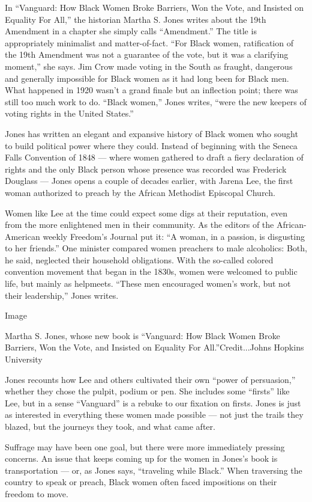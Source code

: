 In ``Vanguard: How Black Women Broke Barriers, Won the Vote, and
Insisted on Equality For All,'' the historian Martha S. Jones writes
about the 19th Amendment in a chapter she simply calls ``Amendment.''
The title is appropriately minimalist and matter-of-fact. ``For Black
women, ratification of the 19th Amendment was not a guarantee of the
vote, but it was a clarifying moment,'' she says. Jim Crow made voting
in the South as fraught, dangerous and generally impossible for Black
women as it had long been for Black men. What happened in 1920 wasn't a
grand finale but an inflection point; there was still too much work to
do. ``Black women,'' Jones writes, ``were the new keepers of voting
rights in the United States.''

Jones has written an elegant and expansive history of Black women who
sought to build political power where they could. Instead of beginning
with the Seneca Falls Convention of 1848 --- where women gathered to
draft a fiery declaration of rights and the only Black person whose
presence was recorded was Frederick Douglass --- Jones opens a couple of
decades earlier, with Jarena Lee, the first woman authorized to preach
by the African Methodist Episcopal Church.

Women like Lee at the time could expect some digs at their reputation,
even from the more enlightened men in their community. As the editors of
the African-American weekly Freedom's Journal put it: ``A woman, in a
passion, is disgusting to her friends.'' One minister compared women
preachers to male alcoholics: Both, he said, neglected their household
obligations. With the so-called colored convention movement that began
in the 1830s, women were welcomed to public life, but mainly as
helpmeets. ``These men encouraged women's work, but not their
leadership,'' Jones writes.

Image

Martha S. Jones, whose new book is ``Vanguard: How Black Women Broke
Barriers, Won the Vote, and Insisted on Equality For
All.''Credit...Johns Hopkins University

Jones recounts how Lee and others cultivated their own ``power of
persuasion,'' whether they chose the pulpit, podium or pen. She includes
some ``firsts'' like Lee, but in a sense ``Vanguard'' is a rebuke to our
fixation on firsts. Jones is just as interested in everything these
women made possible --- not just the trails they blazed, but the
journeys they took, and what came after.

Suffrage may have been one goal, but there were more immediately
pressing concerns. An issue that keeps coming up for the women in
Jones's book is transportation --- or, as Jones says, ``traveling while
Black.'' When traversing the country to speak or preach, Black women
often faced impositions on their freedom to move.

